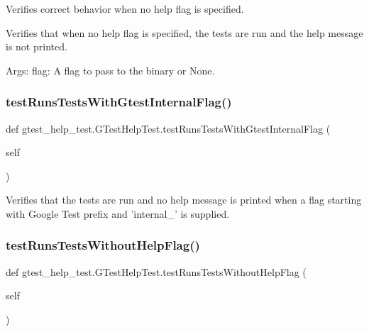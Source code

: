 \begin{DoxyVerb}Verifies correct behavior when no help flag is specified.

Verifies that when no help flag is specified, the tests are run
and the help message is not printed.

Args:
  flag:  A flag to pass to the binary or None.
\end{DoxyVerb}
 \mbox{\label{classgtest__help__test_1_1GTestHelpTest_a0ebec2e3154d22a63e362d2196f9c638}} 
\subsubsection{\texorpdfstring{test\+Runs\+Tests\+With\+Gtest\+Internal\+Flag()}{testRunsTestsWithGtestInternalFlag()}}
{\footnotesize\ttfamily def gtest\+\_\+help\+\_\+test.\+G\+Test\+Help\+Test.\+test\+Runs\+Tests\+With\+Gtest\+Internal\+Flag (\begin{DoxyParamCaption}\item[{}]{self }\end{DoxyParamCaption})}

\begin{DoxyVerb}Verifies that the tests are run and no help message is printed when
a flag starting with Google Test prefix and 'internal_' is supplied.\end{DoxyVerb}
 \mbox{\label{classgtest__help__test_1_1GTestHelpTest_ae7831f92e8e3763c07afb908915b3d20}} 
\subsubsection{\texorpdfstring{test\+Runs\+Tests\+Without\+Help\+Flag()}{testRunsTestsWithoutHelpFlag()}}
{\footnotesize\ttfamily def gtest\+\_\+help\+\_\+test.\+G\+Test\+Help\+Test.\+test\+Runs\+Tests\+Without\+Help\+Flag (\begin{DoxyParamCaption}\item[{}]{self }\end{DoxyParamCaption})}

